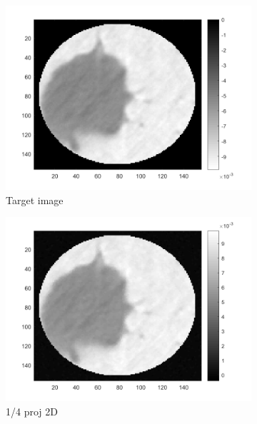 \begin{figure}[ht!]
      		\begin{subfigure}[b]{0.24\textwidth}
            	\centering
            	\includegraphics[width=\textwidth]{../../data/res/target1.png}
            	\caption{Target image}    
        	\end{subfigure}
        	\begin{subfigure}[b]{0.24\textwidth}  
            	\centering 
            	\includegraphics[width=\textwidth]{../../data/res/SB_Reconstruction/2D/Target1/1_4.png}
            	\caption{1/4 proj 2D}    
            	\label{subfig:156p1L-D}
        	\end{subfigure}
        	\begin{subfigure}[b]{0.24\textwidth}  

\end{subfigure}
\end{figure}
